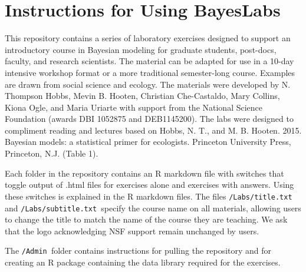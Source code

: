 \documentclass[11pt,american]{article}
\begin{document}
\section*{Instructions for Using BayesLabs}

This repository contains a series of laboratory exercises designed
to support an introductory course in Bayesian modeling for graduate
students, post-docs, faculty, and research scientists. The material
can be adapted for use in a 10-day intensive workshop format or a
more traditional semester-long course. Examples are drawn from social
science and ecology. The materials were developed by N. Thompson Hobbs,
Mevin B. Hooten, Christian Che-Castaldo, Mary Collins, Kiona Ogle,
and Maria Uriarte with support from the National Science Foundation
(awards DBI 1052875 and DEB1145200). The labs were designed to compliment
reading and lectures based on Hobbs, N. T., and M. B. Hooten. 2015.
Bayesian models: a statistical primer for ecologists. Princeton University
Press, Princeton, N.J. (Table 1).

Each folder in the repository contains an R markdown file with switches
that toggle output of .html files for exercises alone and exercises
with answers. Using these switches is explained in the R markdown
files. The files \texttt{/Labs/title.txt }and \texttt{/Labs/subtitle.txt
}specify the course name on all materials, allowing users to change
the title to match the name of the course they are teaching. We ask
that the logo acknowledging NSF support remain unchanged by users. 

The \texttt{/Admin }folder contains instructions for pulling the repository
and for creating an R package containing the data library required
for the exercises.
\end{document}
